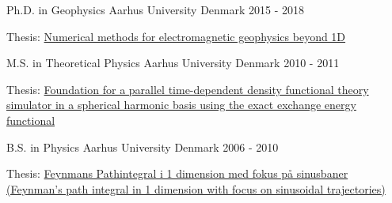 

\begin{cventries}

  \cventry
    {Ph.D. in Geophysics} %
    {Aarhus University} %
    {Denmark} %
    {2015 - 2018} %
    {
      \begin{cvitems} %
        \item {Thesis: \href{https://www.forskningsdatabasen.dk/en/catalog/2392633187}{Numerical methods for electromagnetic geophysics beyond 1D}}
      \end{cvitems}
    }

  \cventry
    {M.S. in Theoretical Physics} %
    {Aarhus University} %
    {Denmark} %
    {2010 - 2011} %
    {
      \begin{cvitems} %
        \item {Thesis: \href{https://phys.au.dk/fileadmin/site_files/forskning/ltc/theses/thesistue.pdf}{Foundation for a parallel time-dependent density functional theory simulator in a spherical harmonic basis using the exact exchange energy functional}}
      \end{cvitems}
    }

  \cventry
    {B.S. in Physics} %
    {Aarhus University} %
    {Denmark} %
    {2006 - 2010} %
    {
      \begin{cvitems} %
        \item {Thesis: \href{https://users-phys.au.dk/~fedorov/subatom/bachelor/tue-feynman-path.pdf}{Feynmans Pathintegral i 1 dimension med fokus på sinusbaner (Feynman's path integral in 1 dimension with focus on sinusoidal \mbox{trajectories})}}
      \end{cvitems}
    }

\end{cventries}
